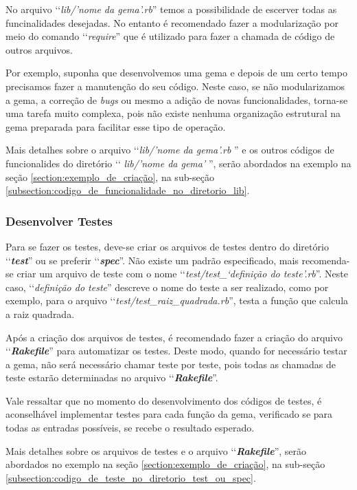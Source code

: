 No arquivo ‘‘\emph{lib/'nome da gema'.rb}'' temos a possibilidade de escerver todas as
funcinalidades desejadas. No entanto é recomendado fazer a modularização por meio do comando
 ‘‘\emph{require}'' que é utilizado para fazer a chamada de código de outros
arquivos.

Por exemplo, suponha que desenvolvemos uma gema e depois de um certo tempo precisamos fazer a manutenção do
seu código. Neste caso, se não modularizamos a gema, a correção de \emph{bugs} ou mesmo a adição de
novas funcionalidades, torna-se uma tarefa muito complexa, pois não existe nenhuma organização
estrutural na gema preparada para facilitar esse tipo de operação.

Mais detalhes sobre o arquivo ‘‘\emph{lib/'nome da gema'.rb} '' e os outros códigos de funcionalides do
diretório ‘‘ \emph{lib/'nome da gema'} '', serão abordados na exemplo na seção
\ref{section:exemplo_de_criação}, na sub-seção \ref{subsection:codigo_de_funcionalidade_no_diretorio_lib}.


\subsubsection{Desenvolver Testes}
\label{subsubsection:desenvolver_testes}


Para se fazer os testes, deve-se criar os arquivos de testes dentro do diretório ‘‘\textbf{\emph{test}}'' ou se
preferir ‘‘\textbf{\emph{spec}}''. Não existe um padrão especificado, mais recomenda-se criar um arquivo de
teste com o nome ‘‘\emph{test/test\_‘definição do teste'.rb}''. Neste caso, ‘‘\emph{definição do teste}''
descreve o nome do teste a ser realizado, como por exemplo, para o arquivo
‘‘\emph{test/test\_raiz\_quadrada.rb}'', testa a função que calcula a raiz quadrada.

Após a criação dos arquivos de testes, é recomendado fazer a criação do arquivo ‘‘\textbf{\emph{Rakefile}}'' para
automatizar os testes. Deste modo, quando for necessário testar a gema, não será necessário chamar teste
por teste, pois todas as chamadas de teste estarão determinadas no arquivo ‘‘\textbf{\emph{Rakefile}}''.

Vale ressaltar que no momento do desenvolvimento dos códigos de testes, é aconselhável implementar testes
para cada função da gema, verificado se para todas as entradas possíveis, se recebe o resultado
esperado.

Mais detalhes sobre os arquivos de testes e o arquivo ‘‘\textbf{\emph{Rakefile}}'', serão abordados no exemplo
na seção \ref{section:exemplo_de_criação}, na sub-seção \ref{subsection:codigo_de_teste_no_diretorio_test_ou_spec}.


